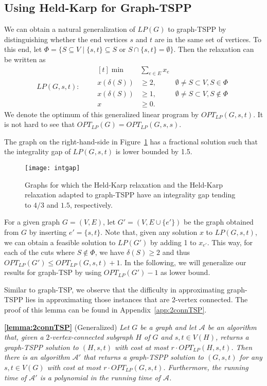 \documentclass[letterpaper,11pt]{article}
\newenvironment{applemma}{\begin{trivlist}
        \item[\hskip\labelsep {\bf Lemma}]}{ \end{trivlist}}
\newcommand{\LP}[1]{\ensuremath{LP(#1)}}
\newcommand{\OLP}[1]{\ensuremath{OPT_{LP}(#1)}}
\newcommand{\TSP}{graph-TSP\xspace}
\newcommand{\HPP}{graph-TSPP\xspace}
\begin{document}
\subsection{Using Held-Karp for Graph-TSPP}\label{sec:HKpath}
We can obtain a natural generalization of $\LP{G}$ to \HPP by distinguishing
whether the end vertices $s$ and $t$ are in the same set of
vertices. To this end, let $\Phi = \{S \subseteq V \mid \{s,t\}
\subseteq S \mbox{ or } S \cap \{s,t\} = \emptyset \}$.  Then the
relaxation can be written as
\begin{equation*}
\LP{G,s,t}: \qquad
\begin{aligned}[t]
  \min & \sum_{e\in E}  x_e \\[2mm]
  x(\delta(S)) & \geq  2, & \emptyset \neq S \subset V, S \in \Phi\\[2mm]
  x(\delta(S)) & \geq  1, & \emptyset \neq S \subset V, S \notin \Phi\\[2mm]
  x & \geq 0.
\end{aligned} 
\end{equation*}
We denote the optimum of this generalized linear program by
\OLP{G,s,t}.  It is not hard to see that $\OLP{G} = \OLP{G,s,s}$. 

The graph on the right-hand-side in Figure~\ref{fig:intgap} has a fractional
solution such that the
integrality gap of $\LP{G,s,t}$ is lower bounded by 1.5.

\begin{figure}[tb]
    \begin{center}
        \texttt{[image: intgap]}
    \end{center}
    \caption{Graphs for which the Held-Karp relaxation and the Held-Karp
    relaxation adapted to \HPP have an integrality gap tending to $4/3$ and $1.5$,
    respectively.}
    \label{fig:intgap}
\end{figure}

For a given graph $G=(V,E)$, let $G'=(V,E \cup \{e'\})$ be the graph obtained from
$G$ by inserting $e'=\{s,t\}$. Note that, given any solution $x$ to $\LP{G,s,t}$, we can
obtain a feasible solution to $\LP{G'}$ by adding 1 to $x_{e'}$. This way, for each of
the cuts where $S \notin \Phi$, we have $\delta(S) \ge 2$ and thus
$\OLP{G'} \le \OLP{G,s,t}+1$.
In the following, we will generalize our results for \TSP by using $\OLP{G'}-1$
as lower bound.

Similar to \TSP, we observe that the difficulty in approximating \HPP
lies in approximating those instances that are $2$-vertex connected.
The proof of this lemma can be found in Appendix~\ref{app:2connTSP}.
\begin{applemma}{\textbf{\ref{lemma:2connTSP}}} (Generalized) \emph{
Let $G$ be a graph and let $\mathcal{A}$ be an algorithm that, given a
$2$-vertex-connected subgraph $H$ of $G$ and $s,t \in V(H)$, returns a
\HPP{} solution to $(H,s,t)$ with cost at most $r \cdot
\OLP{H,s,t}$. Then there is an algorithm
$\mathcal{A}'$ that returns a \HPP{} solution to $(G,s,t)$ for any
$s,t\in V(G)$ with cost at most $r \cdot \OLP{G,s,t}$. Furthermore, the
running time of $\mathcal{A}'$ is a polynomial in the running time of
$\mathcal{A}$.}
\end{applemma}
\end{document}
